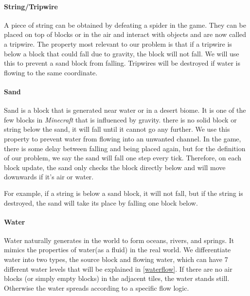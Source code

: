 \paragraph{String/Tripwire\cite{minecraftfandom:string}}
A piece of string can be obtained by defeating a spider in the game.
They can be placed on top of blocks or in the air and interact with objects and are now called a tripwire.
The property most relevant to our problem is that if a tripwire is below a block that could fall due to gravity, the block will not fall.
We will use this to prevent a sand block from falling.
Tripwires will be destroyed if water is flowing to the same coordinate.

\paragraph{Sand\cite{minecraftfandom:sand}}
Sand is a block that is generated near water or in a desert biome.
It is one of the few blocks in \textit{Minecraft} that is influenced by gravity.
 there is no solid block or string below the sand, it will fall until it cannot go any further.
We use this property to prevent water from flowing into an unwanted channel. In the game, there is some delay between falling and being placed again, but for the definition of our problem, we say the sand will fall one step every tick. Therefore, on each block update, the sand only checks the block directly below and will move downwards if it's air or water.

\noindent \newline For example, if a string is below a sand block, it will not fall, but if the string is destroyed, the sand will take its place by falling one block below.

\paragraph{Water}
Water naturally generates in the world to form oceans, rivers, and springs\cite{minecraftfandom:water}. 
It mimics the properties of water(as a fluid) in the real world.
We differentiate water into two types, the source block and flowing water, which can have 7 different water levels that will be explained in \ref{waterflow}. 
If there are no air blocks (or simply empty blocks) in the adjacent tiles,
the water stands still. Otherwise the water spreads according to a specific flow logic.

